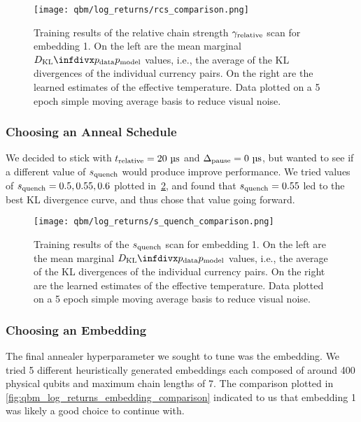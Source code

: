 \begin{figure}[!htb]
    \begin{center}
        \texttt{[image: qbm/log\_returns/rcs\_comparison.png]}
    \end{center}
    \caption{
        Training results of the relative chain strength \( \gamma_{\text{relative}} \) scan for embedding 1.
        On the left are the mean marginal \( \DKL{\pdata}{\pmodel} \) values, i.e., the average of the KL divergences of the individual currency pairs.
        On the right are the learned estimates of the effective temperature.
        Data plotted on a 5 epoch simple moving average basis to reduce visual noise.
    }
    \label{fig:qbm_log_returns_rcs_comparison}
\end{figure}

\subsubsection{Choosing an Anneal Schedule}
We decided to stick with \( \trelative = 20 \ \si{\micro\second} \) and \( \Delta_{\text{pause}} = 0 \ \si{\micro\second} \), but wanted to see if a different value of \( s_{\text{quench}} \) would produce improve performance.
We tried values of \( s_{\text{quench}} = 0.5, 0.55, 0.6 \) plotted in~\cref{fig:qbm_log_returns_s_quench_comparison}, and found that \( s_{\text{quench}} = 0.55 \) led to the best KL divergence curve, and thus chose that value going forward.

\begin{figure}[!htb]
    \begin{center}
        \texttt{[image: qbm/log\_returns/s\_quench\_comparison.png]}
    \end{center}
    \caption{
        Training results of the \( s_{\text{quench}} \) scan for embedding 1.
        On the left are the mean marginal \( \DKL{\pdata}{\pmodel} \) values, i.e., the average of the KL divergences of the individual currency pairs.
        On the right are the learned estimates of the effective temperature.
        Data plotted on a 5 epoch simple moving average basis to reduce visual noise.
    }
    \label{fig:qbm_log_returns_s_quench_comparison}
\end{figure}

\subsubsection{Choosing an Embedding}
The final annealer hyperparameter we sought to tune was the embedding.
We tried 5 different heuristically generated embeddings each composed of around 400 physical qubits and maximum chain lengths of 7.
The comparison plotted in \cref{fig:qbm_log_returns_embedding_comparison} indicated to us that embedding 1 was likely a good choice to continue with.

